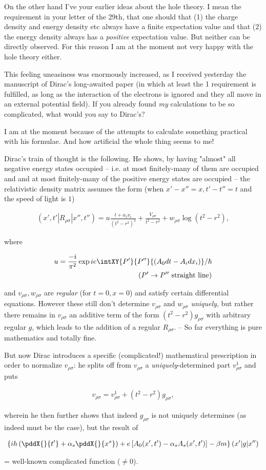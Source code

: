 \documentclass{article}
\newcommand{\uequ}[1]{
\begin{align*}
#1
\end{align*}
}
\begin{document}
On the other hand I've  your earlier ideas about the hole theory. I mean the requirement in your letter of the 29th, that one should  that (1) the charge density and energy density etc always have a finite expectation value and that (2) the energy density always has a \textit{positive} expectation value. But neither can be directly observed. For this reason I am at the moment not very happy with the hole theory either.

This feeling uneasiness was enormously increased, as I received yesterday the manuscript of Dirac's long-awaited paper (in which at least the 1 requirement is fulfilled, as long as the interaction of the electrons is ignored and they all move in an external potential field). If you already found \textit{my} calculations to be so complicated, what would you say to Dirac's?

I am at the moment  because of the attempts to calculate something practical with his formulae. And how artificial the whole thing seems to me!

Dirac's train of thought is the following. He shows, by having "almost" all negative energy states occupied -- i.e. at most finitely-many of them are  occupied and and at most finitely-many of the positive energy states are occupied -- the relativistic density matrix assumes the form (when $x' - x'' = x, t' - t'' = t$ and the speed of light is $1$)
\uequ{
(x',t'|R_{\rho\sigma}|x'',t'') = 
  u\frac{t+\alpha_i x_i}{(t^2 - r^2)^2} + \frac{V_{\rho\sigma}}{t^2 - r^2}
  + w_{\rho\sigma}\log{\left(t^2 - r^2\right)},
}
where
\uequ{
u = \frac{-i}{\pi^2}\exp{ie\intXY{P'}{P''}{\left(A_0 {dt} - A_i {dx_i}\right)}/\hbar}\\
\text{($P' \to P''$ straight line)}
}
and $v_{\rho\sigma},w_{\rho\sigma}$ are \textit{regular} (for $t=0,x=0$) and satisfy certain differential equations. However these still don't determine $v_{\rho\sigma}$ and $w_{\rho\sigma}$ \textit{uniquely}, but rather there remains in $v_{\rho\sigma}$ an additive term of the form $(t^2-r^2)g_{\rho\sigma}$ with arbitrary regular $g$, which leads to the addition of a regular $R_{\rho\sigma}$. -- So far everything is pure mathematics and totally fine.

But now Dirac introduces a specific (complicated!) mathematical prescription in order to normalize $v_{\rho\sigma}$: he splits off from $v_{\rho\sigma}$ a \textit{uniquely}-determined part $v_{\rho\sigma}^1$ and puts
\uequ{
v_{\rho\sigma} = v^1_{\rho\sigma} + (t^2 - r^2)g_{\rho\sigma},
}
wherein he then further shows that indeed $g_{\rho\sigma}$ is not uniquely determines (as indeed must be the case), but  the result of
\uequ{
\left\{ih\left(\pddX{}{t'} + \alpha_s \pddX{}{x^s}\right) +
 e\left[A_0 (x',t') - \alpha_s A_s (x',t')\right] 
- \beta m\right\}(x'|g|x'')
}
= well-known complicated function ($\neq 0$).
\end{document}
